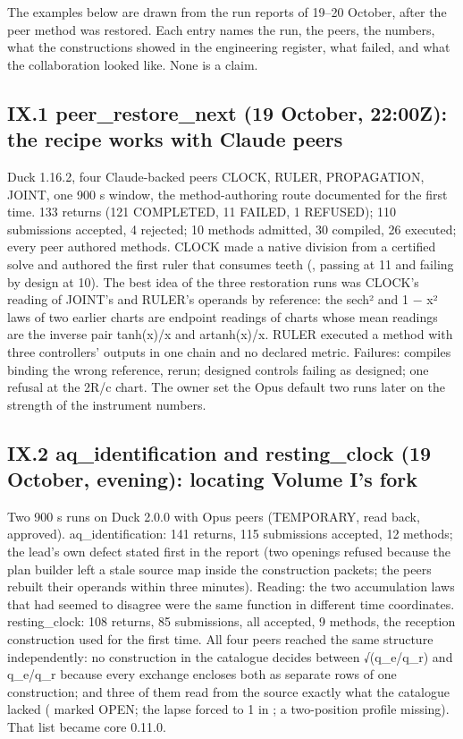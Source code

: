 The examples below are drawn from the run reports of 19--20 October, after the peer method was restored. Each entry names the run, the peers,
the numbers, what the constructions showed in the engineering register, what failed, and what the collaboration looked like. None is a
claim.

\subsection{IX.1 peer\_restore\_next (19 October, 22:00Z): the recipe works with Claude peers}\label{ix.1-peer_restore_next-19-october-2200z-the-recipe-works-with-claude-peers}

Duck 1.16.2, four Claude-backed peers CLOCK, RULER, PROPAGATION, JOINT, one 900 s window, the method-authoring route documented for the first
time. 133 returns (121 COMPLETED, 11 FAILED, 1 REFUSED); 110 submissions accepted, 4 rejected; 10 methods admitted, 30 compiled, 26 executed;
every peer authored methods. CLOCK made a native division from a certified solve and authored the first ruler that consumes teeth
(,  passing at 11 and failing by design at 10). The best idea of the three restoration runs was
CLOCK's reading of JOINT's and RULER's operands by reference: the sech² and 1 − x² laws of two earlier charts are endpoint readings of charts
whose mean readings are the inverse pair tanh(x)/x and artanh(x)/x. RULER executed a method with three controllers' outputs in one chain and
no declared metric. Failures: compiles binding the wrong reference, rerun; designed controls failing as designed; one refusal at the 2R/c
chart. The owner set the Opus default two runs later on the strength of the instrument numbers.

\subsection{IX.2 aq\_identification and resting\_clock (19 October, evening): locating Volume I's fork}\label{ix.2-aq_identification-and-resting_clock-19-october-evening-locating-volume-is-fork}

Two 900 s runs on Duck 2.0.0 with Opus peers (TEMPORARY, read back, approved). aq\_identification: 141 returns, 115 submissions accepted,
12 methods; the lead's own defect stated first in the report (two openings refused because the plan builder left a stale source map inside
the construction packets; the peers rebuilt their operands within three minutes). Reading: the two accumulation laws that had seemed to
disagree were the same function in different time coordinates. resting\_clock: 108 returns, 85 submissions, all accepted, 9 methods, the
reception construction used for the first time. All four peers reached the same structure independently: no construction in the catalogue
decides between √(q\_e/q\_r) and q\_e/q\_r because every exchange encloses both as separate rows of one construction; and three of them read
from the source exactly what the catalogue lacked ( marked OPEN; the lapse forced to 1 in ; a two-position
profile missing). That list became core 0.11.0.

